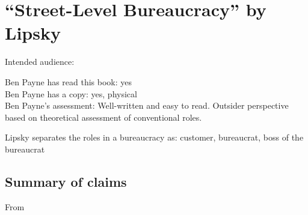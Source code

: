 \section{``Street-Level Bureaucracy'' by Lipsky\label{review:lipsky_street}}

\cite{1983_Lipsky}

Intended audience:

Ben Payne has read this book: yes\\
Ben Payne has a copy: yes, physical\\
Ben Payne's assessment: Well-written and easy to read. Outsider perspective based on theoretical assessment of conventional roles. 


Lipsky separates the roles in a bureaucracy as: customer, bureaucrat, boss of the bureaucrat

\subsection*{Summary of claims}
From \cite{2015_Cooper}
